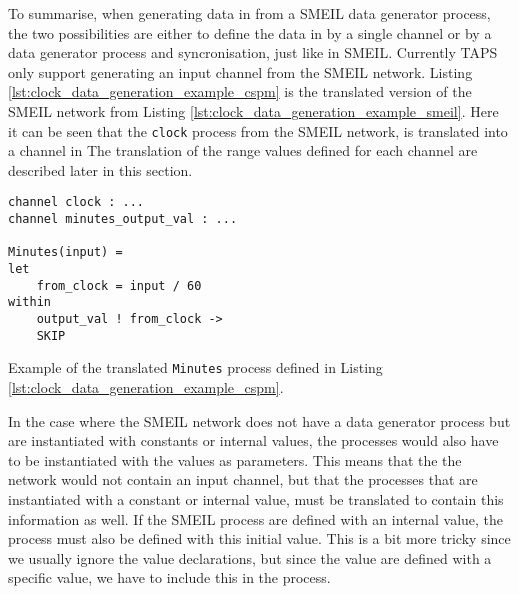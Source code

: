 To summarise, when generating data in \cspm{} from a SMEIL data generator process, the two possibilities are either to define the data in \cspm by a single channel or by a data generator process and syncronisation, just like in SMEIL.
Currently TAPS only support generating an input channel from the SMEIL network.
Listing \ref{lst:clock_data_generation_example_cspm} is the translated version of the SMEIL network from Listing \ref{lst:clock_data_generation_example_smeil}. Here it can be seen that the \texttt{clock} process from the SMEIL network, is translated into a channel in \cspm{}
The translation of the range values defined for each channel are described later in this section.
\begin{listing}
\begin{verbatim}
channel clock : ...
channel minutes_output_val : ...

Minutes(input) =
let
    from_clock = input / 60
within
    output_val ! from_clock ->
    SKIP

\end{verbatim}
\caption{Example of the translated \texttt{Minutes} process defined in Listing \ref{lst:clock_data_generation_example_cspm}.}
\label{lst:channel_range_cspm}
\end{listing}

In the case where the SMEIL network does not have a data generator process but are instantiated with constants or internal values, the \cspm processes would also have to be instantiated with the values as parameters. This means that the the \cspm{} network would not contain an input channel, but that the processes that are instantiated with a constant or internal value, must be translated to contain this information as well.
If the SMEIL process are defined with an internal value, the \cspm{} process must also be defined with this initial value. This is a bit more tricky since we usually ignore the value declarations, but since the value are defined with a specific value, we have to include this in the process.



